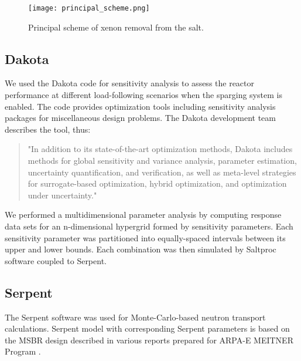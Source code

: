     \begin{figure}[h]
        \begin{center}
            \texttt{[image: principal\_scheme.png]}
        \end{center}
        \caption{Principal scheme of xenon removal from the salt.}
        \label{fig:scheme}
    \end{figure}

\subsection{Dakota}

    We used the Dakota code \cite{adams_dakota_2019} for sensitivity analysis 
    to assess the reactor performance at different load-following scenarios when 
    the sparging system is enabled. The code provides optimization tools 
    including sensitivity analysis packages for miscellaneous design problems. 
    The Dakota development team describes the tool, thus:

    \begin{quote}
        "In addition to its state-of-the-art optimization methods, Dakota
        includes methods for global sensitivity and variance analysis, 
            parameter
        estimation, uncertainty quantification, and verification, as well as
        meta-level strategies for surrogate-based optimization, hybrid
        optimization, and optimization under uncertainty."
    \end{quote}

    We performed a multidimensional parameter analysis by computing response data 
    sets for an n-dimensional hypergrid formed by sensitivity parameters. Each 
    sensitivity parameter was partitioned into equally-spaced intervals between 
    its upper and lower bounds. Each combination was then simulated by Saltproc 
    software coupled to Serpent.

\subsection{Serpent}

    The Serpent software \cite{Lep2014} was used for Monte-Carlo-based neutron 
    transport calculations. Serpent model with corresponding Serpent 
    parameters is based on the MSBR design described in various reports prepared 
    for ARPA-E MEITNER Program \cite{rykhlevskii_fuel_2019, 
    rykhlevskii_modeling_2019, rykhlevskii_fuel_2020}.


